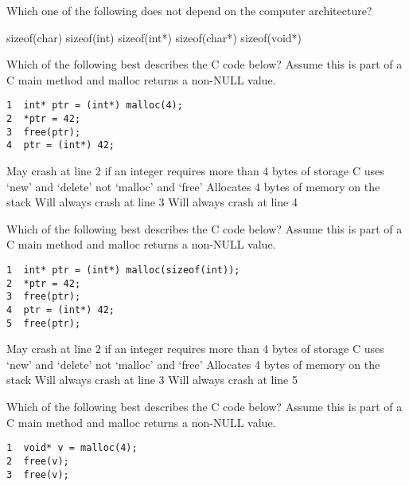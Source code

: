 \variant
Which one of the following does not depend on the computer architecture?
\begin{answers}
\correctanswer sizeof(char)
\answer sizeof(int)
\answer sizeof(int*)
\answer sizeof(char*)
\answer sizeof(void*)
\end{answers}
\begin{solution}
\end{solution}


\variant
Which of the following best describes the C code below? Assume this is part of a C main method and malloc returns a non-NULL value.
\begin{verbatim}
1  int* ptr = (int*) malloc(4);
2  *ptr = 42;
3  free(ptr);
4  ptr = (int*) 42;
\end{verbatim}
\begin{answers}
\correctanswer May crash at line 2 if an integer requires more than 4 bytes of storage
\answer C uses `new' and `delete' not `malloc' and `free'
\answer Allocates 4 bytes of memory on the stack
\answer  Will always crash at line 3
\answer Will always crash at line 4
\end{answers}
\begin{solution}
\end{solution}

\variant
Which of the following best describes the C code below? Assume this is part of a C main method and malloc returns a non-NULL value.
\begin{verbatim}
1  int* ptr = (int*) malloc(sizeof(int));
2  *ptr = 42;
3  free(ptr);
4  ptr = (int*) 42;
5  free(ptr);
\end{verbatim}
\begin{answers}
\answer May crash at line 2 if an integer requires more than 4 bytes of storage
\answer C uses `new' and `delete' not `malloc' and `free'
\answer Allocates 4 bytes of memory on the stack
\answer  Will always crash at line 3
\correctanswer Will always crash at line 5
\end{answers}
\begin{solution}
\end{solution}


\variant
Which of the following best describes the C code below? Assume this is part of a C main method and malloc returns a non-NULL value.
\begin{verbatim}
1  void* v = malloc(4);
2  free(v);
3  free(v);
\end{verbatim}

